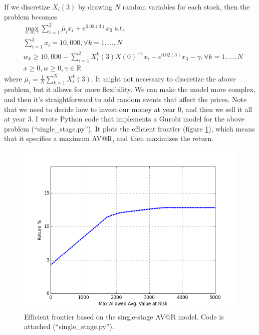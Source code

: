 \documentclass{amsart}
\theoremstyle{definition}
\theoremstyle{remark}
\begin{document}
If we discretize $X_i(3)$ by drawing $N$ random variables for each stock, then the problem becomes
\begin{align*}
&\max_{x,w,\gamma} \sum_{i=1}^2 \bar{\mu}_i x_i +  e^{0.02(3)} x_3 \text{ s.t.}\\
&\sum_{i=1}^3 x_i = 10,000,  \forall k = 1,\ldots, N\\
& w_k \ge 10,000 - \sum_{i=1}^2 X^k_i(3) X(0)^{-1} x_i - e^{0.02(3)} x_3 - \gamma, \forall k = 1,\ldots, N\\
&x \ge 0, w \ge 0, \gamma \in \mathbb{R}
\end{align*}
where $\bar{\mu}_i = \frac{1}{N} \sum_{k=1}^N X_i^k(3)$.
It might not necessary to discretize the above problem, but it allows for more flexibility. We can make the model more complex, and then it's straightforward to add random events that affect the prices. Note that we need to decide how to invest our money at year 0, and then we sell it all at year 3. I wrote Python code that implements a Gurobi model for the above problem (``single\_stage.py''). It plots the efficient frontier (figure \ref{fig:single_stage}), which means that it specifies a maximum AV@R, and then maximizes the return.
\begin{figure}
\centering
\includegraphics[scale=0.5]{single_stage.png}
\caption{Efficient frontier based on the single-stage AV@R model.  Code is attached (``single\_stage.py'').}
\label{fig:single_stage}
\end{figure}
\end{document}

